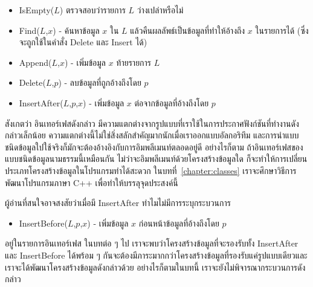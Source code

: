 \begin{itemize}
\item IsEmpty($L$) ตรวจสอบ{\wbr}ว่า{\wbr}รายการ $L$ ว่างเปล่า{\wbr}หรือ{\wbr}ไม่{\wbr}
\item Find($L$,$x$) - ค้นหา{\wbr}ข้อมูล $x$ ใน $L$ แล้ว{\wbr}คืน{\wbr}ผลลัพธ์{\wbr}เป็น{\wbr}ข้อมูล{\wbr}ที่{\wbr}ทำ{\wbr}ให้{\wbr}อ้าง{\wbr}ถึง{\wbr}
  $x$ ใน{\wbr}รายการ{\wbr}ได้ (ซึ่ง{\wbr}จะ{\wbr}ถูก{\wbr}ใช้{\wbr}ใน{\wbr}คำสั่ง Delete และ Insert ได้)
\item Append($L$,$x$) - เพิ่ม{\wbr}ข้อมูล $x$ ท้าย{\wbr}รายการ $L$
\item Delete($L$,$p$) - ลบ{\wbr}ข้อมูล{\wbr}ที่{\wbr}ถูก{\wbr}อ้าง{\wbr}ถึง{\wbr}โดย $p$
\item InsertAfter($L$,$p$,$x$) - เพิ่ม{\wbr}ข้อมูล $x$ ต่อ{\wbr}จาก{\wbr}ข้อมูล{\wbr}ที่{\wbr}อ้าง{\wbr}ถึง{\wbr}โดย $p$
\end{itemize}

สังเกต{\wbr}ว่า อิน{\wbr}เทอร์เฟส{\wbr}ดังกล่าว{\wbr}
มี{\wbr}ความ{\wbr}แตกต่าง{\wbr}จาก{\wbr}รูปแบบ{\wbr}ที่{\wbr}เรา{\wbr}ใช้{\wbr}ใน{\wbr}การ{\wbr}ประกาศ{\wbr}ฟังก์ชัน{\wbr}ที่ทำงาน{\wbr}ดังกล่าว{\wbr}เล็กน้อย{\wbr}
ความ{\wbr}แตกต่าง{\wbr}นี้{\wbr}ไม่{\wbr}ใช่{\wbr}สิ่ง{\wbr}สลักสำคัญ{\wbr}มาก{\wbr}นัก{\wbr}เมื่อ{\wbr}เรา{\wbr}ออกแบบ{\wbr}อัล{\wbr}กอ{\wbr}ริ{\wbr}ทึม{\wbr}
และ{\wbr}การ{\wbr}นำ{\wbr}แบบ{\wbr}ชนิด{\wbr}ข้อมูล{\wbr}ใป{\wbr}ใช้{\wbr}จริง{\wbr}ก็{\wbr}มักจะ{\wbr}ต้อง{\wbr}อ้างอิง{\wbr}กับ{\wbr}การ{\wbr}อิม{\wbr}พลี{\wbr}เมนท์{\wbr}ตลอด{\wbr}อยู่{\wbr}ดี อย่างไรก็ตาม{\wbr}
ถ้า{\wbr}อิน{\wbr}เทอร์เฟส{\wbr}ของ{\wbr}แบบ{\wbr}ชนิด{\wbr}ข้อมูล{\wbr}นามธรรม{\wbr}นี้{\wbr}เหมือน{\wbr}กัน{\wbr}
ไม่ว่า{\wbr}จะ{\wbr}อิม{\wbr}พลี{\wbr}เมนท์{\wbr}ด้วย{\wbr}โครงสร้าง{\wbr}ข้อมูล{\wbr}ใด{\wbr}
ก็{\wbr}จะ{\wbr}ทำ{\wbr}ให้การ{\wbr}เปลี่ยน{\wbr}ประเภท{\wbr}โครงสร้าง{\wbr}ข้อมูล{\wbr}ใน{\wbr}โปรแกรม{\wbr}ทำ{\wbr}ได้{\wbr}สะดวก{\wbr}
ใน{\wbr}บท{\wbr}ที่~\ref{chapter:classes} เรา{\wbr}จะ{\wbr}ศึกษา{\wbr}วิธีการ{\wbr}พัฒนา{\wbr}โปรแกรม{\wbr}ภาษา C++
เพื่อ{\wbr}ทำ{\wbr}ให้{\wbr}บรรลุ{\wbr}จุดประสงค์{\wbr}นี้{\wbr}

ผู้อ่าน{\wbr}ที่{\wbr}สนใจ{\wbr}อาจ{\wbr}สงสัย{\wbr}ว่า{\wbr}เมื่อ{\wbr}มี InsertAfter ทำไม{\wbr}ไม่{\wbr}มี{\wbr}การ{\wbr}ระบุ{\wbr}กระบวนการ{\wbr}
\begin{itemize}
\item InsertBefore($L$,$p$,$x$) - เพิ่ม{\wbr}ข้อมูล $x$ ก่อนหน้า{\wbr}ข้อมูล{\wbr}ที่{\wbr}อ้าง{\wbr}ถึง{\wbr}โดย $p$
\end{itemize}
อยู่{\wbr}ใน{\wbr}รายการ{\wbr}อิน{\wbr}เทอร์เฟส ใน{\wbr}บท{\wbr}ต่อ ๆ ไป เรา{\wbr}จะ{\wbr}พบ{\wbr}ว่า{\wbr}โครงสร้าง{\wbr}ข้อมูล{\wbr}ที่{\wbr}จะ{\wbr}รองรับ{\wbr}ทั้ง{\wbr}
InsertAfter และ InsertBefore ได้{\wbr}พร้อม ๆ
กัน{\wbr}จะ{\wbr}ต้อง{\wbr}มี{\wbr}ภาระ{\wbr}มาก{\wbr}กว่า{\wbr}โครงสร้าง{\wbr}ข้อมูล{\wbr}ที่{\wbr}รองรับ{\wbr}แค่{\wbr}รูปแบบ{\wbr}เดียว{\wbr}และ{\wbr}เรา{\wbr}จะ{\wbr}ได้{\wbr}พัฒนา{\wbr}โครงสร้าง{\wbr}ข้อมูล{\wbr}ดังกล่าว{\wbr}ด้วย{\wbr}
อย่างไรก็ตาม{\wbr}ใน{\wbr}บท{\wbr}นี้ เรา{\wbr}จะ{\wbr}ยัง{\wbr}ไม่{\wbr}พิจารณา{\wbr}กระบวนการ{\wbr}ดังกล่าว{\wbr}

